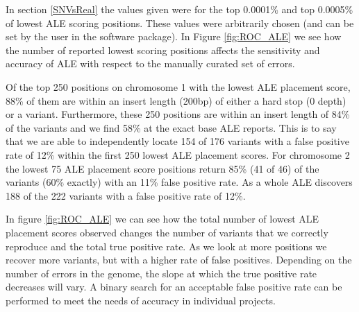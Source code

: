 \documentclass[phd,tocprelim]{cornell}
\begin{document}
In section \ref{SNVsReal} the values given were for the top 0.0001\% and top 0.0005\% of lowest ALE scoring positions. These values were arbitrarily chosen (and can be set by the user in the software package). In Figure \ref{fig:ROC_ALE} we see how the number of reported lowest scoring positions affects the sensitivity and accuracy of ALE with respect to the manually curated set of errors.

Of the top 250 positions on chromosome 1 with the lowest ALE placement score, 88\% of
them are within an insert length (200bp) of either a hard stop (0 depth) or a variant. Furthermore,
these 250 positions are within an insert length of 84\% of the variants and we find 58\% at the
exact base ALE reports. This is to say that we are able to independently locate 154 of 176
variants with a false positive rate of 12\% within the first 250 lowest ALE placement scores. For
chromosome 2 the lowest 75 ALE placement score positions return 85\% (41 of 46) of the variants
(60\% exactly) with an 11\% false positive rate. As a whole ALE discovers 188 of the 222 variants
with a false positive rate of 12\%.

In figure \ref{fig:ROC_ALE} we can see how the total number of lowest ALE placement scores observed
changes the number of variants that we correctly reproduce and the total true positive rate. As
we look at more positions we recover more variants, but with a higher rate of false positives.
Depending on the number of errors in the genome, the slope at which the true positive rate
decreases will vary. A binary search for an acceptable false positive rate can be performed to
meet the needs of accuracy in individual projects.
\end{document}
